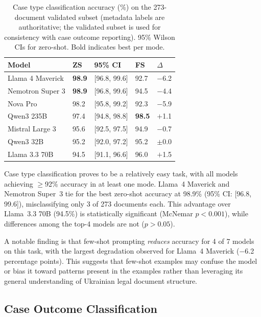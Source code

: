 \documentclass[11pt,a4paper]{article}
\begin{document}
\begin{table}[t]
\centering
\caption{Case type classification accuracy (\%) on the 273-document validated subset (metadata labels are authoritative; the validated subset is used for consistency with case outcome reporting). 95\% Wilson CIs for zero-shot. Bold indicates best per mode.}
\label{tab:case_type}
\begin{tabular}{lR{1.6cm}R{2.6cm}R{1.6cm}R{1.6cm}}
\toprule
\textbf{Model} & \textbf{ZS} & \textbf{95\% CI} & \textbf{FS} & \textbf{$\Delta$} \\
\midrule
Llama 4 Maverick  & \textbf{98.9} & [96.8, 99.6] & 92.7 & $-$6.2 \\
Nemotron Super 3  & \textbf{98.9} & [96.8, 99.6] & 94.5 & $-$4.4 \\
Nova Pro          & 98.2          & [95.8, 99.2] & 92.3 & $-$5.9 \\
Qwen3 235B        & 97.4          & [94.8, 98.8] & \textbf{98.5} & $+$1.1 \\
Mistral Large 3   & 95.6          & [92.5, 97.5] & 94.9 & $-$0.7 \\
Qwen3 32B         & 95.2          & [92.0, 97.2] & 95.2 & $\pm$0.0 \\
Llama 3.3 70B     & 94.5          & [91.1, 96.6] & 96.0 & $+$1.5 \\
\bottomrule
\end{tabular}
\end{table}

Case type classification proves to be a relatively easy task, with all models achieving $\geq$92\% accuracy in at least one mode. Llama~4 Maverick and Nemotron Super~3 tie for the best zero-shot accuracy at 98.9\% (95\% CI: [96.8, 99.6]), misclassifying only 3 of 273 documents each. This advantage over Llama~3.3 70B (94.5\%) is statistically significant (McNemar $p < 0.001$), while differences among the top-4 models are not ($p > 0.05$).

A notable finding is that few-shot prompting \emph{reduces} accuracy for 4 of 7 models on this task, with the largest degradation observed for Llama~4 Maverick ($-$6.2 percentage points). This suggests that few-shot examples may confuse the model or bias it toward patterns present in the examples rather than leveraging its general understanding of Ukrainian legal document structure.

\subsection{Case Outcome Classification}
\label{sec:results_outcome}
\end{document}
